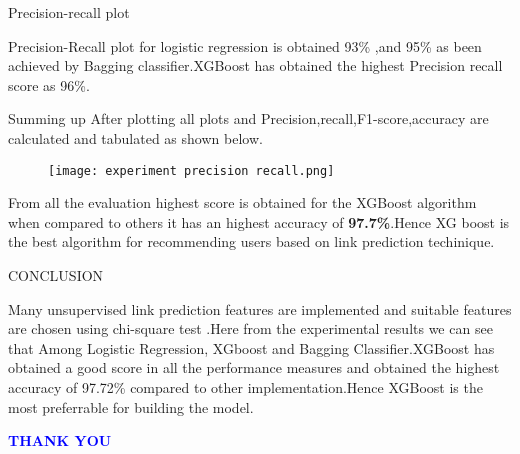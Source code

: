 \documentclass{beamer}
\begin{document}
\begin{frame}
\begin{block}{Precision-recall plot}
\begin{figure}[ht]
 \hfill 	
 \hfill	
\end{figure}
Precision-Recall plot for logistic regression is obtained 93\% 
,and 95\% as been achieved by Bagging classifier.XGBoost has obtained the highest Precision recall score as 96\%.
\end{block}
\end{frame}
\begin{frame}
\begin{block}{Summing up}
After plotting all plots and Precision,recall,F1-score,accuracy are calculated and tabulated as shown below.
\begin{figure}[ht]
    \centering
    \texttt{[image: experiment precision recall.png]}
\end{figure}
From all the evaluation highest score is obtained for the XGBoost algorithm when compared to others it has an highest accuracy of \textbf{97.7\%}.Hence XG boost is the best algorithm for recommending users based on link prediction techinique.
\end{block}
\end{frame}
\begin{frame}{CONCLUSION}
\begin{block}{}
Many unsupervised link prediction features are implemented and  suitable features are chosen using chi-square test .Here from the experimental results we can see that Among Logistic Regression, XGboost and Bagging Classifier.XGBoost has obtained a good score in all the performance  measures and obtained the highest accuracy of 97.72\% compared to other implementation.Hence XGBoost is the most preferrable for building the model.
\end{block}
\end{frame}
\begin{frame}
     \centering
    \textcolor{blue}{\Huge{\textbf{THANK YOU}}}
\end{frame}
\end{document}
